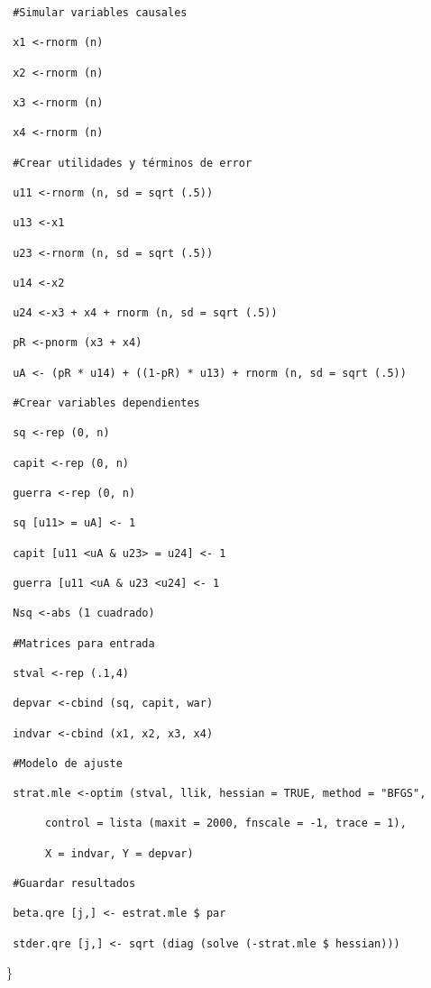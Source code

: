 \documentclass[
]{book}
\begin{document}
\begin{verbatim}
 #Simular variables causales

 x1 <-rnorm (n)

 x2 <-rnorm (n)

 x3 <-rnorm (n)

 x4 <-rnorm (n)

 #Crear utilidades y términos de error

 u11 <-rnorm (n, sd = sqrt (.5))

 u13 <-x1

 u23 <-rnorm (n, sd = sqrt (.5))

 u14 <-x2

 u24 <-x3 + x4 + rnorm (n, sd = sqrt (.5))

 pR <-pnorm (x3 + x4)

 uA <- (pR * u14) + ((1-pR) * u13) + rnorm (n, sd = sqrt (.5))

 #Crear variables dependientes

 sq <-rep (0, n)

 capit <-rep (0, n)

 guerra <-rep (0, n)

 sq [u11> = uA] <- 1

 capit [u11 <uA & u23> = u24] <- 1

 guerra [u11 <uA & u23 <u24] <- 1

 Nsq <-abs (1 cuadrado)

 #Matrices para entrada

 stval <-rep (.1,4)

 depvar <-cbind (sq, capit, war)

 indvar <-cbind (x1, x2, x3, x4)

 #Modelo de ajuste

 strat.mle <-optim (stval, llik, hessian = TRUE, method = "BFGS",

      control = lista (maxit = 2000, fnscale = -1, trace = 1),

      X = indvar, Y = depvar)

 #Guardar resultados

 beta.qre [j,] <- estrat.mle $ par

 stder.qre [j,] <- sqrt (diag (solve (-strat.mle $ hessian)))
\end{verbatim}

\}
\end{document}
